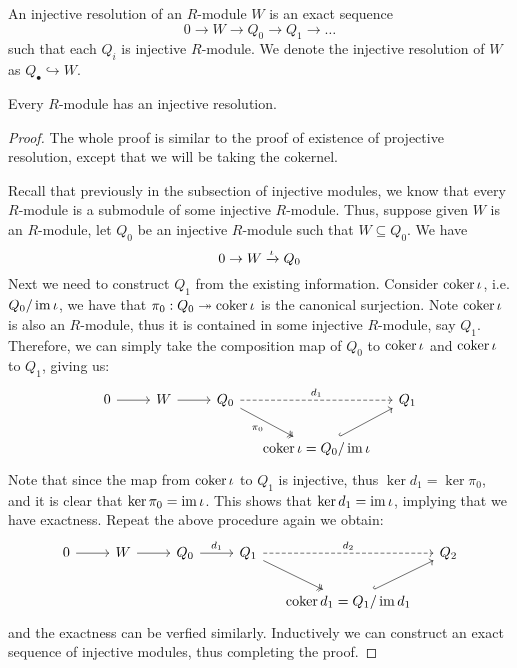 \medskip

\begin{defn} 
    An injective resolution of an $R$-module $W$ is an exact sequence 
    \[0 \to W \to Q_0 \to Q_1 \to \dots\]
    such that each $Q_i$ is injective $R$-module. We denote the injective resolution of $W$ as $Q_\bullet \hookrightarrow W$.
\end{defn}

\medskip

\begin{pro}
    Every $R$-module has an injective resolution.
\end{pro}
\begin{proof}
    
    The whole proof is similar to the proof of existence of projective resolution, except that we will be taking the cokernel.

    Recall that previously in the subsection of injective modules, we know that every $R$-module is a submodule of some injective $R$-module. Thus, suppose given $W$ is an $R$-module, let $Q_0$ be an injective $R$-module such that $W\subseteq Q_0$. We have 
    \[0\to W \xrightarrow{\iota} Q_0\]
    Next we need to construct $Q_1$ from the existing information. Consider $\operatorname{coker} \iota$, i.e. $Q_0/\operatorname{im}\iota$, we have that $\pi_0: Q_0\twoheadrightarrow \operatorname{coker} \iota$ is the canonical surjection. Note $\operatorname{coker} \iota$ is also an $R$-module, thus it is contained in some injective $R$-module, say $Q_1$. Therefore, we can simply take the composition map of $Q_0$ to $\operatorname{coker} \iota$ and $\operatorname{coker} \iota$ to $Q_1$, giving us:
    \[\begin{tikzcd}[sep=small]
	0 && W && {Q_0} && {Q_1} \\
	\\
	&&&&& {\coker \iota = Q_0/\im \iota}
	\arrow[from=1-1, to=1-3]
	\arrow[from=1-3, to=1-5]
	\arrow["d_1",dashed, from=1-5, to=1-7]
	\arrow["\pi_0"',two heads,from=1-5, to=3-6]
	\arrow[hook, from=3-6, to=1-7]
    \end{tikzcd}\]
    Note that since the map from $\operatorname{coker} \iota$ to $Q_1$ is injective, thus $\ker d_1 = \ker \pi_0$, and it is clear that $\ker \pi_0=\operatorname{im} \iota$. This shows that $\ker d_1 = \operatorname{im} \iota$, implying that we have exactness. Repeat the above procedure again we obtain:
    \[\begin{tikzcd}[sep=small]
	0 && W && {Q_0} && {Q_1} && {Q_2} \\
	\\
	&&&&&&& {\coker d_1= Q_1/\im d_1}
	\arrow[from=1-1, to=1-3]
	\arrow[from=1-3, to=1-5]
	\arrow["{d_1}", from=1-5, to=1-7]
	\arrow["{d_2}", dashed, from=1-7, to=1-9]
	\arrow[two heads, from=1-7, to=3-8]
	\arrow[hook, from=3-8, to=1-9]
    \end{tikzcd}\]
    and the exactness can be verfied similarly. Inductively we can construct an exact sequence of injective modules, thus completing the proof.
\end{proof}

